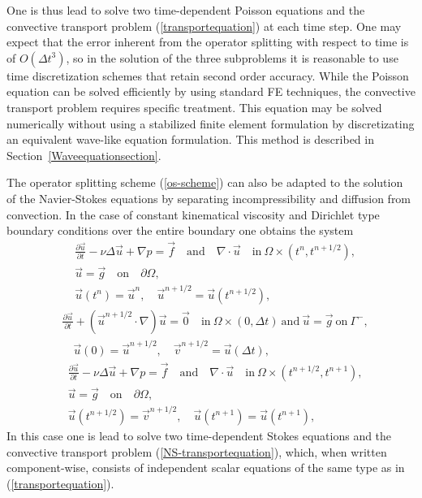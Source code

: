 \begin{versiona}
One is thus lead to solve two time-dependent Poisson 
equations and the convective transport problem (\ref{transportequation})
at each time step.
One may expect that the error inherent from the operator splitting with 
respect to time is of $O(\Delta t^3)$, so in the solution of
the three subproblems it is reasonable to use time discretization schemes that
retain second order accuracy.
While the Poisson equation can be solved efficiently by using standard FE 
techniques, the convective transport problem requires specific treatment.  
This equation may be solved numerically without using a stabilized finite 
element formulation by discretizating an equivalent wave-like equation
formulation. This method is described in Section~\ref{Waveequationsection}.

The operator splitting scheme (\ref{os-scheme}) can also be adapted to the 
solution of the Navier-Stokes equations by separating incompressibility and 
diffusion from convection.
In the case of constant kinematical viscosity and Dirichlet type boundary 
conditions over the entire boundary one obtains the system \cite{DG97}  
\begin{equation}
\begin{split}
&\frac{\partial \vec u}{\partial t}-\nu\Delta\vec u+\nabla p = \vec f \quad 
\mathrm{and} \quad \nabla\cdot\vec u \quad
\mathrm{in}\ \Omega\times(t^n,t^{n+1/2}), \\ 
&\vec u = \vec g \quad \mathrm{on}\quad \partial\Omega, \\ 
&\vec u(t^n)=\vec u^n, \quad \vec u^{n+1/2}=\vec u(t^{n+1/2}), 
\end{split}
\end{equation}
\begin{equation}\label{NS-transportequation}
\begin{split}
&\frac{\partial \vec u}{\partial t}+(\vec u^{n+1/2}\cdot\nabla)\vec u=\vec 0 
\quad \mathrm{in}\ \Omega \times (0,\Delta t) \ \mathrm{and} \ \vec u=\vec g \ 
\mathrm{on}\ \Gamma^-,  \\ 
&\quad \vec u(0)=\vec u^{n+1/2}, \quad \vec{v}^{n+1/2}=\vec u(\Delta t),
\end{split}
\end{equation}
\begin{equation}
\begin{split}
&\frac{\partial \vec u}{\partial t}-\nu\Delta\vec u+\nabla p = \vec f \quad 
\mathrm{and} \quad \nabla\cdot\vec u \quad
\mathrm{in}\ \Omega\times(t^{n+1/2},t^{n+1}), \\ 
&\vec u = \vec g \quad \mathrm{on}\quad \partial\Omega, \\ 
&\vec u(t^{n+1/2})=\vec{v}^{n+1/2}, \quad \vec u(t^{n+1})=\vec u(t^{n+1}), 
\end{split}
\end{equation}
In this case one is lead to solve two time-dependent Stokes equations and
the convective transport problem (\ref{NS-transportequation}), which, when
written component-wise, consists 
of independent scalar equations of the same type as in 
(\ref{transportequation}).
  


\end{versiona}

